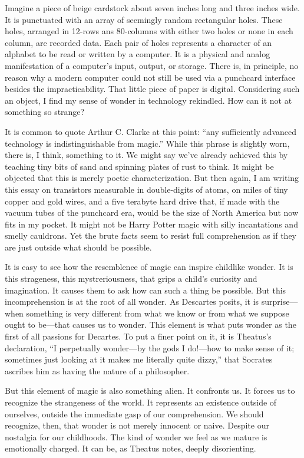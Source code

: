 \documentclass{article}
\begin{document}
Imagine a piece of beige cardstock about seven inches long and three inches
wide.
It is punctuated with an array of seemingly random rectangular holes.
These holes, arranged in 12-rows ans 80-columns with either two holes or none in
each column, are recorded data.
Each pair of holes represents a character of an alphabet to be read or written
by a computer.
It is a physical and analog manifestation of a computer's input, output, or
storage.
There is, in principle, no reason why a modern computer could not still be used
via a punchcard interface besides the impracticability.
That little piece of paper is digital.
Considering such an object, I find my sense of wonder in technology rekindled.
How can it not at something so strange?

It is common to quote Arthur C. Clarke at this point: ``any sufficiently
advanced technology is indistinguishable from magic.''
While this phrase is slightly worn, there is, I think, something to it.
We might say we've already achieved this by teaching tiny bits of sand and
spinning plates of rust to think.
It might be objected that this is merely poetic characterization.
But then again, I am writing this essay on transistors measurable in
double-digits of atoms, on miles of tiny copper and gold wires, and a five
terabyte hard drive that, if made with the vacuum tubes of the punchcard era,
would be the size of North America but now fits in my pocket.
It might not be Harry Potter magic with silly incantations and smelly cauldrons.
Yet the brute facts seem to resist full comprehension as if they are just
outside what should be possible.

It is easy to see how the resemblence of magic can inspire childlike wonder.
It is this strageness, this mystreriousness, that grips a child's curiosity and
imagination.
It causes them to ask how can such a thing be possible.
But  this incomprehension is at the root of all wonder.
As Descartes posits, it is surprise---when something is very different from what
we know or from what we suppose ought to be---that causes us to wonder.
This element is what puts wonder as the first of all passions for Decartes.
To put a finer point on it, it is Theatus's declaration, ``I perpetually
wonder---by the gods I do!---how to make sense of it; sometimes just looking at
it makes me literally quite dizzy,'' that Socrates ascribes him as having the
nature of a philosopher.

But this element of magic is also something alien.
It confronts us.
It forces us to recognize the strangeness of the world.
It represents an existence outside of ourselves, outside the immediate gasp of
our comprehension.
We should recognize, then, that wonder is not merely innocent or naive.
Despite our nostalgia for our childhoods.
The kind of wonder we feel as we mature is emotionally charged.
It can be, as Theatus notes, deeply disorienting.
\end{document}
